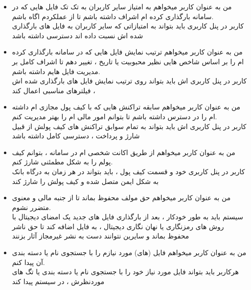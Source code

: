 \documentclass{article}
\begin{document}
\begin{itemize}
	\item من به عنوان کاربر میخواهم به امتیاز سایر کاربران به تک تک فایل هایی که در سامانه بارگذاری کرده ام اشراف  داشته باشم تا از عملکردم اگاه باشم.
	\\
کاربر در پنل کاربری باید بتواند به امتیازاتی که سایر کاربران به فایل های بارگذاری شده اش نسبت داده اند دسترسی داشته باشد

	\item من به عنوان کاربر میخواهم ترتیب نمایش فایل هایی که در سامانه بارگذاری کرده ام را بر اساس شاخص هایی نظیر محبوبیت یا تاریخ ، تغییر دهم تا اشراف کامل بر مدیریت فایل هایم داشته باشم.
	\\
کاربر در پنل کاربری اش باید بتواند روی ترتیب نمایش فایل های بارگذاری شده اش ، فیلترهای مناسبی اعمال کند

	\item من به عنوان کاربر میخواهم سابقه تراکنش هایی که با کیف پول مجازی ام داشته ام را در دسترس داشته باشم تا بتوانم امور مالی ام را بهتر مدیریت کنم.
	\\
کاربر در پنل کاربری اش باید بتواند به تمام سوابق تراکنش های کیف پولش از قبیل شارژ و پرداخت ، دسترسی کامل داشته باشد

	\item من به عنوان کاربر میخواهم از طریق اکانت شخصی ام در سامانه ، بتوانم کیف پولم را به شکل مطمئنی شارژ کنم.
	\\
کاربر در پنل کاربری خود و قسمت کیف پول ، باید بتواند در هر زمان به درگاه بانک به شکل ایمن متصل شده و کیف پولش را شارژ کند

	\item من به عنوان کاربر میخواهم حق مولف محفوظ بماند تا از جنبه مالی و معنوی متضرر نشوم.
	\\
سیستم باید به طور خودکار ، بعد از بارگذاری فایل های جدید یک امضای دیجیتال با روش های رمزنگاری یا نهان نگاری دیجیتال ، به فایل اضافه کند تا حق ناشر محفوظ بماند و سایرین نتوانند دست به نشر غیرمجاز آثار بزنند

	\item من به عنوان کاربر میخواهم فایل (های) مورد نیازم را با جستجوی نام یا دسته بندی آن پیدا کنم.
	\\
هرکاربر باید بتواند فایل مورد نیاز خود را با جستجوی نام یا دسته بندی یا تگ های موردنظرش ، در سیستم پیدا کند	
\end{itemize}
\end{document}

